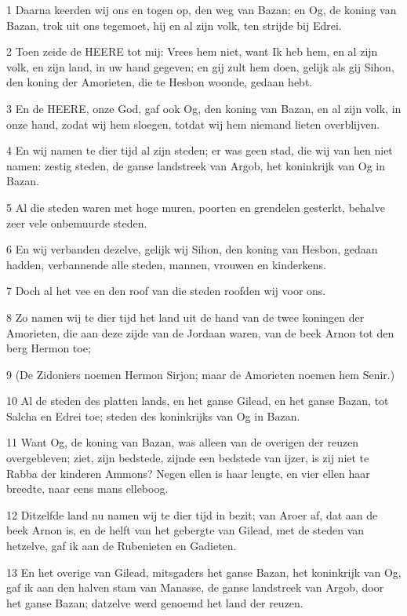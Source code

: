 \par 1 Daarna keerden wij ons en togen op, den weg van Bazan; en Og, de koning van Bazan, trok uit ons tegemoet, hij en al zijn volk, ten strijde bij Edrei.
\par 2 Toen zeide de HEERE tot mij: Vrees hem niet, want Ik heb hem, en al zijn volk, en zijn land, in uw hand gegeven; en gij zult hem doen, gelijk als gij Sihon, den koning der Amorieten, die te Hesbon woonde, gedaan hebt.
\par 3 En de HEERE, onze God, gaf ook Og, den koning van Bazan, en al zijn volk, in onze hand, zodat wij hem sloegen, totdat wij hem niemand lieten overblijven.
\par 4 En wij namen te dier tijd al zijn steden; er was geen stad, die wij van hen niet namen: zestig steden, de ganse landstreek van Argob, het koninkrijk van Og in Bazan.
\par 5 Al die steden waren met hoge muren, poorten en grendelen gesterkt, behalve zeer vele onbemuurde steden.
\par 6 En wij verbanden dezelve, gelijk wij Sihon, den koning van Hesbon, gedaan hadden, verbannende alle steden, mannen, vrouwen en kinderkens.
\par 7 Doch al het vee en den roof van die steden roofden wij voor ons.
\par 8 Zo namen wij te dier tijd het land uit de hand van de twee koningen der Amorieten, die aan deze zijde van de Jordaan waren, van de beek Arnon tot den berg Hermon toe;
\par 9 (De Zidoniers noemen Hermon Sirjon; maar de Amorieten noemen hem Senir.)
\par 10 Al de steden des platten lands, en het ganse Gilead, en het ganse Bazan, tot Salcha en Edrei toe; steden des koninkrijks van Og in Bazan.
\par 11 Want Og, de koning van Bazan, was alleen van de overigen der reuzen overgebleven; ziet, zijn bedstede, zijnde een bedstede van ijzer, is zij niet te Rabba der kinderen Ammons? Negen ellen is haar lengte, en vier ellen haar breedte, naar eens mans elleboog.
\par 12 Ditzelfde land nu namen wij te dier tijd in bezit; van Aroer af, dat aan de beek Arnon is, en de helft van het gebergte van Gilead, met de steden van hetzelve, gaf ik aan de Rubenieten en Gadieten.
\par 13 En het overige van Gilead, mitsgaders het ganse Bazan, het koninkrijk van Og, gaf ik aan den halven stam van Manasse, de ganse landstreek van Argob, door het ganse Bazan; datzelve werd genoemd het land der reuzen.
